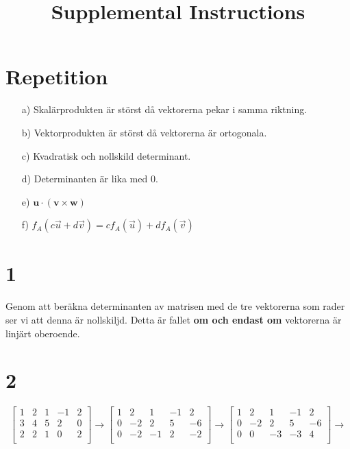 \documentclass{article}
\title{Supplemental Instructions}
\date{
     }
\begin{document}
\maketitle

\section*{Repetition}
\begin{itemize}
\item[a) ] Skalärprodukten är störst då vektorerna pekar i samma riktning.
\item[b) ] Vektorprodukten är störst då vektorerna är ortogonala.
\item[c) ] Kvadratisk och nollskild determinant.
\item[d) ] Determinanten är lika med 0.
\item[e) ] $\mathbf{u} \cdot (\mathbf{v} \times \mathbf{w})$
\item[f) ] $f_{A}(c\vec{u} + d\vec{v}) = c f_{A}(\vec{u}) + d f_{A}(\vec{v})$

\end{itemize}


\section*{1}
Genom att beräkna determinanten av matrisen med de tre vektorerna som rader 
ser vi att denna är nollskiljd. Detta är fallet {\bf om och endast om} 
vektorerna är linjärt oberoende.


\section*{2}
$$
\begin{bmatrix}
    1  &  2  &  1  & -1  &  2 \\
    3  &  4  &  5  &  2  &  0 \\
    2  &  2  &  1  &  0  &  2 \\
\end{bmatrix} \rightarrow 
\begin{bmatrix}
    1  &  2  &  1  & -1  &  2 \\
    0  & -2  &  2  &  5  & -6 \\
    0  & -2  & -1  &  2  & -2 \\
\end{bmatrix} \rightarrow
\begin{bmatrix}
    1  &  2  &  1  & -1  &  2 \\
    0  & -2  &  2  &  5  & -6 \\
    0  &  0  & -3  & -3  &  4 \\
\end{bmatrix} \rightarrow
$$
\end{document}
